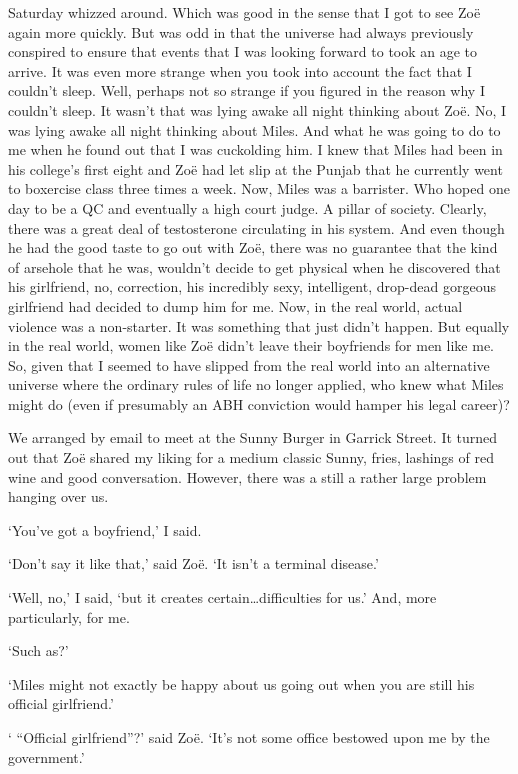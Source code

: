 Saturday whizzed around. Which was good in the sense that I got to
see Zo{\"e} again more quickly. But was odd in that the universe had
always previously conspired to ensure that events that I was looking
forward to took an age to arrive. It was even more strange when you
took into account the fact that I couldn't sleep. Well, perhaps not
so strange if you figured in the reason why I couldn't sleep. It
wasn't that was lying awake all night thinking about Zo{\"e}. No, I
was lying awake all night thinking about Miles. And what he was
going to do to me when he found out that I was cuckolding him. I
knew that Miles had been in his college's first eight and Zo{\"e} had let
slip at the Punjab that he currently went to boxercise class three
times a week. Now, Miles was a barrister. Who hoped one day to be a
QC and eventually a high court judge. A pillar of society. Clearly,
there was a great deal of testosterone circulating in his system. And
even though he had the good taste to go out with Zo{\"e}, there was
no guarantee that the kind of arsehole that he was, wouldn't decide
to get physical when he discovered that his girlfriend, no,
correction, his incredibly sexy, intelligent, drop-dead gorgeous
girlfriend had decided to dump him for {\twelveit me}. Now, in the real world,
actual violence was a non-starter. It was something that just didn't
happen. But equally in the real world, women like Zo{\"e} didn't
leave their boyfriends for men like me. So, given that I seemed to have
slipped from the real world into an alternative universe where the
ordinary rules of life no longer applied, who knew what Miles might
do (even if presumably an ABH conviction would hamper his legal career)?

We arranged by email to meet at the Sunny Burger in Garrick Street. It
turned out that Zo{\"e} shared my liking for a medium
classic Sunny, fries, lashings of red wine and good conversation.
However, there was a still a rather large problem hanging over us.

`You've got a boyfriend,' I said.

`Don't say it like that,' said Zo{\"e}. `It isn't a terminal
disease.'

`Well, no,' I said, `but it creates certain\dots difficulties for
us.' And, more particularly, for me.

`Such as?'

`Miles might not exactly be happy about us going out when you are
still his official girlfriend.'

` ``Official girlfriend''?' said Zo{\"e}. `It's not some office
bestowed upon me by the government.'

